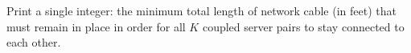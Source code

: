 

Print a single integer: the minimum total length of network cable (in feet) that must remain in place in order for all $K$ coupled server pairs to stay connected to each other.